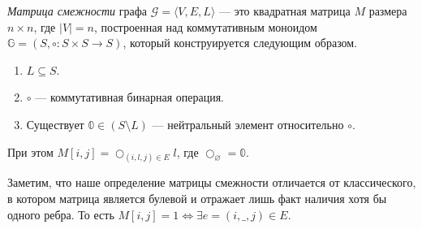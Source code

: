 \begin{definition}
  \textit{Матрица смежности} графа $\mathcal{G}=\langle V,E,L \rangle$ --- это квадратная матрица $M$ размера $n \times n$, где $|V| = n$, построенная над коммутативным моноидом $\mathbb{G} = (S,\circ\colon S \times S \to S)$, который конструируется следующим образом.

  \begin{enumerate}
    \item $L \subseteq S$.
    \item $\circ$ --- коммутативная бинарная операция.
    \item Существует $ \mathbb{0} \in (S \setminus L)$ --- нейтральный элемент относительно $\circ$.
  \end{enumerate}

  При этом $M[i,j] = \bigcirc_{(i,l,j) \in E}l$, где $\bigcirc_\varnothing = \mathbb{0}$.
\end{definition}

Заметим, что наше определение матрицы смежности отличается от классического, в котором матрица является булевой и отражает лишь факт наличия хотя бы одного ребра. То есть $M[i,j] = 1 \iff \exists e = (i,\_,j) \in E$.

